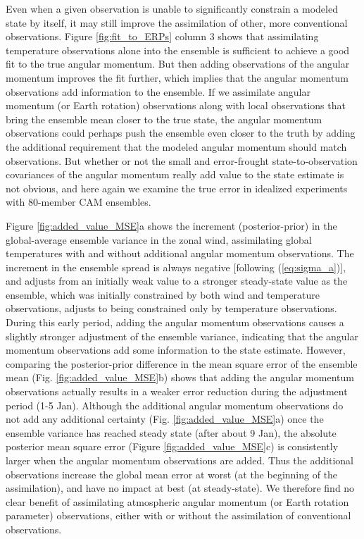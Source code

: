 Even when a given observation is unable to significantly constrain a modeled state by itself, it may still improve the assimilation of other, more conventional observations.  
Figure \ref{fig:fit_to_ERPs} column 3 shows that assimilating 
temperature observations alone into the ensemble is sufficient to achieve a good fit to the true angular momentum.
But then adding observations of the angular momentum improves the fit further, which implies that  
the angular momentum observations add information to the ensemble. 
If we assimilate angular momentum (or Earth rotation) observations along with local observations that bring the ensemble mean closer to the true state, the angular momentum observations could perhaps push the ensemble even closer to the truth 
by adding the additional requirement that the modeled angular momentum should match observations. 
But whether or not the small and error-frought state-to-observation covariances of the angular momentum really add value to the state estimate is not obvious, and here again we examine the true error in idealized experiments with 80-member CAM ensembles. 

Figure \ref{fig:added_value_MSE}a shows the increment (posterior-prior) in the global-average ensemble variance in the zonal wind, assimilating global temperatures with and without additional angular momentum observations. 
The increment in the ensemble spread is always negative [following (\ref{eq:sigma_a})], and adjusts from an initially weak value to a stronger steady-state value as the ensemble, which was initially constrained by both wind and temperature observations, adjusts to being constrained only by temperature observations. 
During this early period, adding the angular momentum observations causes a slightly stronger adjustment of the ensemble variance, indicating that the angular momentum observations add some information to the state estimate. 
However, comparing the posterior-prior difference in the mean square error of the ensemble mean (Fig. \ref{fig:added_value_MSE}b) shows that adding the angular momentum observations actually results in a weaker error reduction during the adjustment period (1-5 Jan). 
Although the additional angular momentum observations do not add any additional certainty (Fig. \ref{fig:added_value_MSE}a) once the ensemble variance has reached steady state (after about 9 Jan), 
the absolute posterior mean square error (Figure \ref{fig:added_value_MSE}c) is consistently larger when the angular momentum observations are added. 
Thus the additional observations increase the global mean error at worst (at the beginning of the assimilation), and have no impact at best (at steady-state). 
We therefore find no clear benefit of assimilating atmospheric angular momentum (or Earth rotation parameter) observations, either with or without the assimilation of conventional observations. 

